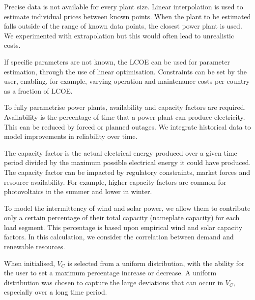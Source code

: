 
Precise data is not available for every plant size. Linear interpolation is used to estimate individual prices between known points. When the plant to be estimated falls outside of the range of known data points, the closest power plant is used. We experimented with extrapolation but this would often lead to unrealistic costs. %

If specific parameters are not known, the LCOE can be used for parameter estimation, through the use of linear optimisation. Constraints can be set by the user, enabling, for example, varying operation and maintenance costs per country as a fraction of LCOE.

To fully parametrise power plants, availability and capacity factors are required. Availability is the percentage of time that a power plant can produce electricity. This can be reduced by forced or planned outages. We integrate historical data to model improvements in reliability over time.

The capacity factor is the actual electrical energy produced over a given time period divided by the maximum possible electrical energy it could have produced. The capacity factor can be impacted by regulatory constraints, market forces and resource availability. For example, higher capacity factors are common for photovoltaics in the summer and lower in winter. 

To model the intermittency of wind and solar power, we allow them to contribute only a certain percentage of their total capacity (nameplate capacity) for each load segment. This percentage is based upon empirical wind and solar capacity factors. In this calculation, we consider the correlation between demand and renewable resources. 

When initialised, $V_C$ is selected from a uniform distribution, with the ability for the user to set a maximum percentage increase or decrease. A uniform distribution was chosen to capture the large deviations that can occur in $V_C$, especially over a long time period. \vphantom{By doing this, the variance in costs between individual power plants for processes such as preventative and corrective maintenance, labour costs and skill, health and safety and chance are different per plant instant.}

